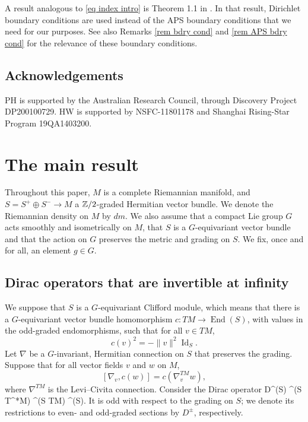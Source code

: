 \documentclass[11pt]{article}
\theoremstyle{plain}
\theoremstyle{definition}
\theoremstyle{remark}
\numberwithin{equation}{section}
\DeclareMathOperator{\Id}{Id}
\DeclareMathOperator{\End}{End}
\begin{document}
A result analogous to \eqref{eq index intro} is  Theorem 1.1 in  \cite{CLWY20}. In that result, Dirichlet boundary conditions are used instead of the APS boundary conditions that we need for our purposes.
See also Remarks \ref{rem bdry cond} and \ref{rem APS bdry cond} for the relevance of these boundary conditions.

\subsection*{Acknowledgements}

PH is supported by the Australian Research Council, through Discovery Project DP200100729.
HW is supported by NSFC-11801178 and Shanghai Rising-Star Program 19QA1403200.

\section{The main result}



Throughout this paper, $M$ is a complete Riemannian manifold, and $S  = S^+ \oplus S^-\to M$ a $\mathbb{Z}/2$-graded Hermitian vector bundle.
We denote the Riemannian density on $M$ by $dm$. We also assume that a compact Lie group $G$ acts smoothly and isometrically on $M$, that $S$ is a $G$-equivariant vector bundle and that the action on $G$ preserves the metric and grading on $S$. We fix, once and for all, an element $g \in G$.


\subsection{Dirac operators that are invertible at infinity}\label{sec dirac ops}

We suppose that $S$ is a $G$-equivariant Clifford module, which means that there is a $G$-equivariant vector bundle homomorphism $c\colon TM \to \End(S)$, with values in the odd-graded endomorphisms, such that for all $v \in TM$,
\[
c(v)^2 = -\|v\|^2 \Id_S.
\]
Let $\nabla$ be a $G$-invariant, Hermitian connection on $S$ that preserves the grading. Suppose that for all vector fields $v$ and $w$ on $M$,
\[
[\nabla_v, c(w)] = c(\nabla^{TM}_v w),
\]
where $\nabla^{TM}$ is the Levi--Civita connection. Consider the Dirac operator
D\colon \Gamma^{\infty}(S) \xrightarrow{\nabla} \Gamma^{\infty}(S \otimes T^*M) \cong
 \Gamma^{\infty}(S \otimes TM)   \Gamma^{\infty}(S).
\eeq
It is odd with respect to the grading on $S$; we denote its restrictions to even- and odd-graded sections by $D^{\pm}$, respectively.
\end{document}
